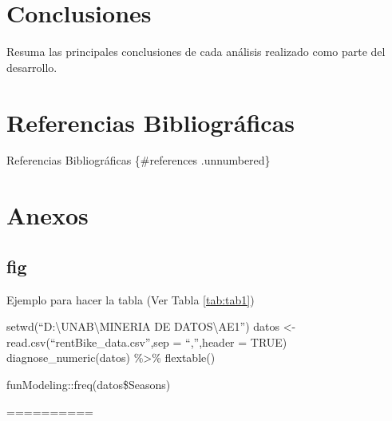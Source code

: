 \documentclass[]{elsarticle} %
\begin{document}
\section{Conclusiones}

Resuma las principales conclusiones de cada análisis realizado como
parte del desarrollo.

\section{Referencias Bibliográficas}

Referencias Bibliográficas \{\#references .unnumbered\}

\section{Anexos}
\subsection{fig}

Ejemplo para hacer la tabla (Ver Tabla \ref{tab:tab1})

setwd(``D:\textbackslash UNAB\textbackslash MINERIA DE
DATOS\textbackslash AE1'') datos \textless-
read.csv(``rentBike\_data.csv'',sep = ``,'',header = TRUE)
diagnose\_numeric(datos) \%\textgreater\% flextable()

funModeling::freq(datos\$Seasons)

==========


\end{document}
